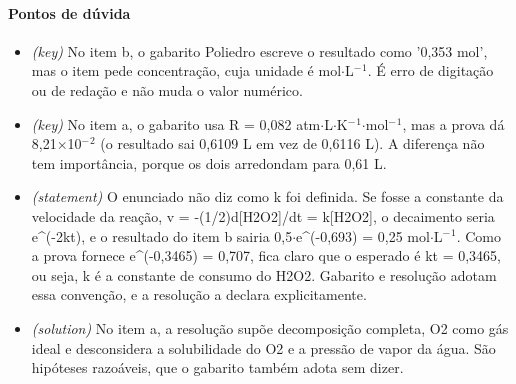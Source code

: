 \documentclass{article}%
\begin{document}
\paragraph{Pontos de dúvida}%
\begin{itemize}%
\item%
\textit{(key)} No item b, o gabarito Poliedro escreve o resultado como '0,353 mol', mas o item pede concentração, cuja unidade é mol$\cdot$L$^{-}$$^{1}$. É erro de digitação ou de redação e não muda o valor numérico.%
\item%
\textit{(key)} No item a, o gabarito usa R = 0,082 atm$\cdot$L$\cdot$K$^{-}$$^{1}$$\cdot$mol$^{-}$$^{1}$, mas a prova dá 8,21$\times$10$^{-}$$^2$ (o resultado sai 0,6109 L em vez de 0,6116 L). A diferença não tem importância, porque os dois arredondam para 0,61 L.%
\item%
\textit{(statement)} O enunciado não diz como k foi definida. Se fosse a constante da velocidade da reação, v = -(1/2)d{[}H2O2{]}/dt = k{[}H2O2{]}, o decaimento seria e\^{}(-2kt), e o resultado do item b sairia 0,5$\cdot$e\^{}(-0,693) = 0,25 mol$\cdot$L$^{-}$$^{1}$. Como a prova fornece e\^{}(-0,3465) = 0,707, fica claro que o esperado é kt = 0,3465, ou seja, k é a constante de consumo do H2O2. Gabarito e resolução adotam essa convenção, e a resolução a declara explicitamente.%
\item%
\textit{(solution)} No item a, a resolução supõe decomposição completa, O2 como gás ideal e desconsidera a solubilidade do O2 e a pressão de vapor da água. São hipóteses razoáveis, que o gabarito também adota sem dizer.%
\end{itemize}%
\end{document}
